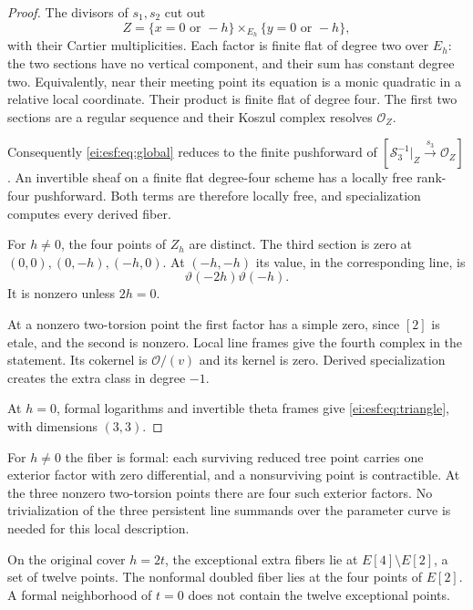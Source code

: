 \begin{proof}
The divisors of $s_1,s_2$ cut out
\[
 Z=\{x=0\text{ or }-h\}\times_{E_h}
   \{y=0\text{ or }-h\},
\]
with their Cartier multiplicities. Each factor is finite
flat of degree two over $E_h$: the two sections have no
vertical component, and their sum has constant degree two.
Equivalently, near their meeting point its equation is a
monic quadratic in a relative local coordinate. Their
product is finite flat of degree four. The first two
sections are a regular sequence and their Koszul complex
resolves $\mathcal O_Z$.

Consequently \eqref{ei:esf:eq:global} reduces to the finite
pushforward of
$[\mathcal S_3^{-1}|_Z\xrightarrow{s_3}\mathcal O_Z]$.
An invertible sheaf on a finite flat degree-four scheme
has a locally free rank-four pushforward. Both terms are
therefore locally free, and specialization computes every
derived fiber.

For $h\ne0$, the four points of $Z_h$ are distinct.
The third section is zero at $(0,0),(0,-h),(-h,0)$.
At $(-h,-h)$ its value, in the corresponding line, is
\begin{equation}\label{ei:esf:eq:fourth-branch}
 \vartheta(-2h)\vartheta(-h).
\end{equation}
It is nonzero unless $2h=0$.

At a nonzero two-torsion
point the first factor has a simple zero, since $[2]$
is etale, and the second is nonzero. Local line frames
give the fourth complex in the statement. Its cokernel
is $\mathcal O/(v)$ and its kernel is zero. Derived
specialization creates the extra class in degree $-1$.

At $h=0$, formal logarithms and invertible theta frames
give \eqref{ei:esf:eq:triangle}, with dimensions $(3,3)$.
\end{proof}

For $h\ne0$ the fiber is formal: each surviving reduced
tree point carries one exterior factor with zero
differential, and a nonsurviving point is contractible.
At the three nonzero two-torsion points there are four
such exterior factors. No trivialization of the three
persistent line summands over the parameter curve is
needed for this local description.

On the original cover $h=2t$, the exceptional extra fibers
lie at $E[4]\setminus E[2]$, a set of twelve points.
The nonformal doubled fiber lies at the four points of
$E[2]$. A formal neighborhood of $t=0$ does not contain
the twelve exceptional points.

